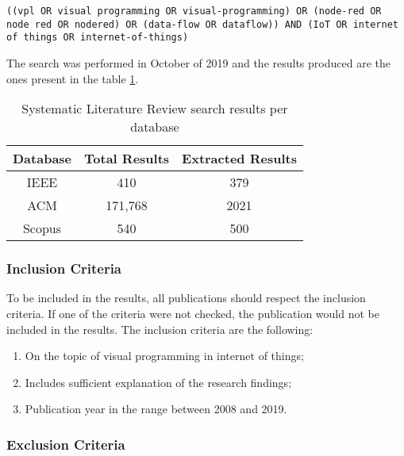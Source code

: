 \noindent
\begin{lstlisting}[frame=none, numbers=none, backgroundcolor=\color{white},]
((vpl OR visual programming OR visual-programming) OR (node-red OR node red OR nodered) OR (data-flow OR dataflow)) AND (IoT OR internet of things OR internet-of-things)
\end{lstlisting}

The search was performed in October of 2019 and the results produced are the ones present in the table \ref{tab:slr_search_results}.

\captionsetup{belowskip=12pt,aboveskip=4pt}
\begin{table}[ht]
    \centering
    \caption{Systematic Literature Review search results per database}
    \begin{tabular}{| c | c | c |}
        \hline
        \textbf{Database} & \textbf{Total Results} & \textbf{Extracted Results}\\
        \hline
        IEEE & 410 & 379 \\
        \hline
        ACM & 171,768 & 2021 \\
        \hline
        Scopus & 540 & 500 \\
        \hline
    \end{tabular}
    \label{tab:slr_search_results}
\end{table}{}

\subsubsection{Inclusion Criteria}\label{sec:inclusion}

To be included in the results, all publications should respect the inclusion criteria. If one of the criteria were not checked, the publication would not be included in the results. The inclusion criteria are the following:

\begin{enumerate}
    \item On the topic of visual programming in internet of things;
    \item Includes sufficient explanation of the research findings;
    \item Publication year in the range between 2008 and 2019.
\end{enumerate}{}

\subsubsection{Exclusion Criteria}\label{sec:exclusion}

